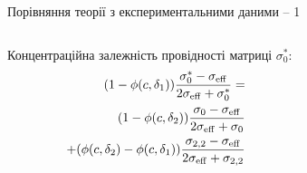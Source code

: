 \documentclass[10pt]{beamer}
\begin{document}
\begin{frame}{Порівняння теорії з експериментальними даними -- 1}
\begin{columns}[T,onlytextwidth]
    \vspace{5pt}
        Концентраційна залежність провідності матриці $\sigma_0^*$:
        \vspace{-5pt}
        \begin{eqnarray*}
        &&(1 - \phi(c,\delta_1))\frac{\sigma_0^* - \sigma_{\rm
        eff}}{2\sigma_{\rm eff} + \sigma_0^*}=\nonumber\\
        &&(1 - \phi(c,\delta_2))
        \frac{\sigma_0 - \sigma_{\rm eff}}{2\sigma_{\rm eff} + \sigma_0}
         \nonumber\\
        &&+ (\phi(c,\delta_2) - \phi(c,\delta_1)) \frac{\sigma_{2,2} -
        \sigma_{\rm eff}}{2\sigma_{\rm eff} + \sigma_{2,2}}
        \end{eqnarray*}
      
\end{columns}

\end{frame}
\end{document}
